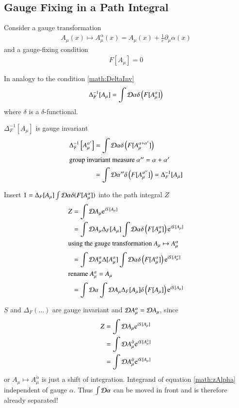 \subsection{Gauge Fixing in a Path Integral}
Consider a gauge transformation 
\begin{align}
   A_\mu(x) \mapsto A_\mu^\alpha(x) = A_\mu(x) + \frac{1}{e} \partial_\mu \alpha(x)
\end{align}
and a gauge-fixing condition 
\begin{align}
   F[A_\mu] = 0
\end{align}

In analogy to the condition \ref{math:DeltaInv}
\begin{align}
   \Delta_F^{-1}[A_\mu] = \int \mathcal{D} \alpha \delta \left(F[A_\mu^\alpha] \right)
\end{align}
where $\delta$ is a $\delta$-functional.

$\Delta_F^{-1}[A_\mu]$ is gauge invariant
\begin{align*}
   \Delta_F^{-1} \left[ A_\mu^{\alpha'} \right] &= \int \mathcal{D} \alpha \delta \left( F [A_\mu^{\alpha+\alpha'}] \right) \\
   \shortintertext{group invariant measure $\alpha'' = \alpha + \alpha'$}
                        &= \int \mathcal{D} \alpha''  \delta \left( F[A_\mu^{\alpha''}] \right) = \Delta_F^{-1}[A_\mu]
\end{align*}

Insert $1 = \Delta_F [A_\mu] \int \mathcal{D} \alpha \delta(F[A_\mu^\alpha])$ into the path integral $Z$
\begin{align}
   Z &= \int \mathcal{D} A_\mu \mathrm{e}^{iS[A_\mu]} \notag\\
     &= \int \mathcal{D} A_\mu \Delta_F[A_\mu] \int \mathcal{D} \alpha \delta \left( F[A_\mu^\alpha] \right) \mathrm{e}^{iS[A_\mu]} \notag\\
   \shortintertext{using the gauge transformation $A_\mu \mapsto A_\mu^\alpha$}
     &= \int \mathcal{D} A_\mu^\alpha \Delta [A_\mu^\alpha] \int \mathcal{D} \alpha \delta \left( F[A_\mu^\alpha] \right)\mathrm{e}^{iS[A^\alpha_\mu]} \notag \\
     \shortintertext{rename $A^\alpha_\mu = A_\mu$}
     &= \int \mathcal{D} \alpha \int \mathcal{D} A_\mu  \Delta_F [A_\mu] \delta \left( F[A_\mu] \right) \mathrm{e}^{iS[A_\mu]} \label{math:zAlpha}
\end{align}

$S$ and $\Delta_F(\dots)$ are gauge invariant and $\mathcal{D} A_\mu^\alpha = \mathcal{D} A_\mu$, since
\begin{align*}
   Z &= \int \mathcal{D} A_\mu \mathrm{e}^{iS[A_\mu]} \\
     &= \int \mathcal{D} A_\mu^{\tilde{\alpha}} \mathrm{e}^{iS[A_\mu^{\tilde{\alpha}}]} \\
     &= \int \mathcal{D} A_\mu^{\tilde{\alpha}} \mathrm{e}^{iS[A_\mu]}
\end{align*}
or $A_\mu \mapsto A_\mu^{\tilde{\alpha}}$ is just a shift of integration. Integrand of equation \ref{math:zAlpha} independent of gauge $\alpha$. Thus $\int \mathcal{D} \alpha$ can be moved in front and is therefore already separated!


